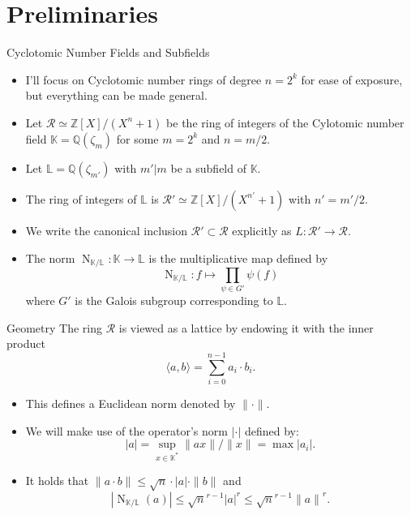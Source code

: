 \documentclass[presentation,smaller]{beamer}
\newcommand{\cR}{\ensuremath{\mathcal{R}}\xspace}
\newcommand{\Z}{\ensuremath{\mathbb Z}\xspace}
\newcommand{\K}{\ensuremath{\mathbb K}\xspace}
\renewcommand{\L}{\ensuremath{\mathbb L}\xspace}
\newcommand{\Q}{\ensuremath{\mathbb Q}\xspace}
\DeclareMathOperator{\Norm}{N}
\begin{document}
\section{Preliminaries}
\label{sec:org9253576}

\begin{frame}[label={sec:orgcecd824}]{Cyclotomic Number Fields and Subfields}
\begin{itemize}
\item I’ll focus on Cyclotomic number rings of degree \(n = 2^k\) for ease of exposure, but everything can be made general.

\item Let \(\cR ≃ \Z[X]/(X^{n}+1)\) be the ring of integers of the Cylotomic number field \(\K = \Q(ζ_m)\) for some \(m=2^k\) and \(n = m/2\).

\item Let \(\L = \Q(ζ_{m'})\) with \(m' | m\) be a subfield of \(\K\).

\item The ring of integers of \(\L\) is \(\cR' ≃ \Z[X]/(X^{n'} + 1)\) with \(n' = m'/2\).

\item We write the canonical inclusion \(\cR' \subset \cR\) explicitly as \(L : \cR' \rightarrow \cR\).

\item The norm \(\Norm_{\K/\L}: \K \rightarrow \L\) is the multiplicative map defined by \[\Norm_{\K/\L} : f \mapsto  \prod_{\psi \in G'} \psi(f)\] where \(G'\) is the Galois subgroup corresponding to \(\L\).
\end{itemize}
\end{frame}

\begin{frame}[label={sec:org760b88e}]{Geometry}
The ring \(\cR\) is viewed as a lattice by endowing it with the inner product \[\langle a , b\rangle = \sum_{i=0}^{n-1} a_i ⋅ b_i.\] 

\begin{itemize}
\item This defines a Euclidean norm denoted by \(\| \cdot \|\).

\item We will make use of the operator's norm \(|\cdot|\) defined by: \[|a| = \sup_{x \in \K^*} \|ax\|/\|x\| = \max |a_i|.\]

\item It holds that \(\| a⋅b \| ≤ \sqrt{n} ⋅ |a| ⋅ \| b \|\) and \[|\Norm_{\K/\L}(a)| ≤ \sqrt{n}^{r-1} {|a|}^r ≤ \sqrt{n}^{r-1} {\|a\|}^r.\]
\end{itemize}
\end{frame}
\end{document}
